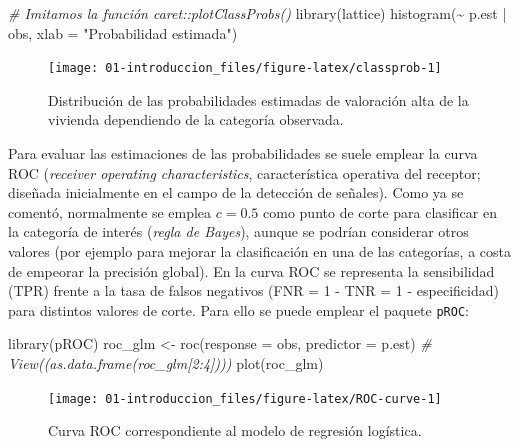 \documentclass[
]{book}
\newenvironment{Shaded}{\begin{snugshade}}{\end{snugshade}}
\newcommand{\AttributeTok}[1]{\textcolor[rgb]{0.77,0.63,0.00}{#1}}
\newcommand{\CommentTok}[1]{\textcolor[rgb]{0.56,0.35,0.01}{\textit{#1}}}
\newcommand{\FunctionTok}[1]{\textcolor[rgb]{0.00,0.00,0.00}{#1}}
\newcommand{\NormalTok}[1]{#1}
\newcommand{\OtherTok}[1]{\textcolor[rgb]{0.56,0.35,0.01}{#1}}
\newcommand{\SpecialCharTok}[1]{\textcolor[rgb]{0.00,0.00,0.00}{#1}}
\newcommand{\StringTok}[1]{\textcolor[rgb]{0.31,0.60,0.02}{#1}}
\theoremstyle{break}
\theoremstyle{definition}
\theoremstyle{definition}
\theoremstyle{definition}
\theoremstyle{definition}
\theoremstyle{remark}
\begin{document}
\begin{Shaded}
\begin{Highlighting}[]
\CommentTok{\# Imitamos la función caret::plotClassProbs()}
\FunctionTok{library}\NormalTok{(lattice) }
\FunctionTok{histogram}\NormalTok{(}\SpecialCharTok{\textasciitilde{}}\NormalTok{ p.est }\SpecialCharTok{|}\NormalTok{ obs, }\AttributeTok{xlab =} \StringTok{"Probabilidad estimada"}\NormalTok{)}
\end{Highlighting}
\end{Shaded}

\begin{figure}[!htb]

{\centering \texttt{[image: 01-introduccion\_files/figure-latex/classprob-1]} 

}

\caption{Distribución de las probabilidades estimadas de valoración alta de la vivienda dependiendo de la categoría observada.}\label{fig:classprob}
\end{figure}

Para evaluar las estimaciones de las probabilidades se suele emplear la curva ROC (\emph{receiver operating characteristics}, característica operativa del receptor; diseñada inicialmente en el campo de la detección de señales).
Como ya se comentó, normalmente se emplea \(c = 0.5\) como punto de corte para clasificar en la categoría de interés (\emph{regla de Bayes}), aunque se podrían considerar otros valores (por ejemplo para mejorar la clasificación en una de las categorías, a costa de empeorar la precisión global).
En la curva ROC se representa la sensibilidad (TPR) frente a la tasa de falsos negativos (FNR = 1 - TNR = 1 - especificidad) para distintos valores de corte.
Para ello se puede emplear el paquete \texttt{pROC}:

\begin{Shaded}
\begin{Highlighting}[]
\FunctionTok{library}\NormalTok{(pROC)}
\NormalTok{roc\_glm }\OtherTok{\textless{}{-}} \FunctionTok{roc}\NormalTok{(}\AttributeTok{response =}\NormalTok{ obs, }\AttributeTok{predictor =}\NormalTok{ p.est)}
\CommentTok{\# View((as.data.frame(roc\_glm[2:4])))}
\FunctionTok{plot}\NormalTok{(roc\_glm)}
\end{Highlighting}
\end{Shaded}

\begin{figure}[!htb]

{\centering \texttt{[image: 01-introduccion\_files/figure-latex/ROC-curve-1]} 

}

\caption{Curva ROC correspondiente al modelo de regresión logística.}\label{fig:ROC-curve}
\end{figure}
\end{document}
